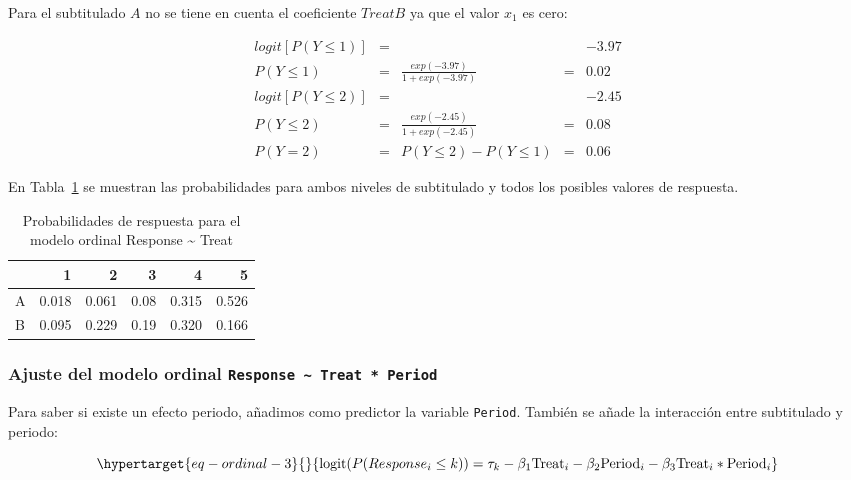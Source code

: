 \documentclass[
  12pt,
  a4paper,
  extrafontsizes,
  onecolumn,
  openright,
  table]{memoir}
\begin{document}
Para el subtitulado \(A\) no se tiene en cuenta el coeficiente
\(TreatB\) ya que el valor \(x_1\) es cero:

\[
\begin{aligned}
logit [P(Y \le 1)] & = & & & -3.97 \\
P(Y \le 1) & = & \frac{exp(-3.97)}{1 + exp(-3.97)} & = & 0.02 \\
logit [P(Y \le 2)] & = & & & -2.45 \\
P(Y \le 2) & = & \frac{exp(-2.45)}{1 + exp(-2.45)} & = & 0.08 \\
P(Y = 2) & = & P(Y \le 2) - P(Y \le 1) & = &  0.06 
\end{aligned}
\]

En Tabla~\ref{tbl-probs-clm-treat} se muestran las probabilidades para
ambos niveles de subtitulado y todos los posibles valores de respuesta.

\hypertarget{tbl-probs-clm-treat}{}
\begin{table}
\caption{\label{tbl-probs-clm-treat}Probabilidades de respuesta para el modelo ordinal Response
\textasciitilde{} Treat }\tabularnewline

\centering
\begin{tabular}{l|r|r|r|r|r}
\hline
  & 1 & 2 & 3 & 4 & 5\\
\hline
A & 0.018 & 0.061 & 0.08 & 0.315 & 0.526\\
\hline
B & 0.095 & 0.229 & 0.19 & 0.320 & 0.166\\
\hline
\end{tabular}
\end{table}

\hypertarget{sec-response-treat.period}{%
\subsubsection{\texorpdfstring{Ajuste del modelo ordinal
\texttt{Response\ \textasciitilde{}\ Treat\ *\ Period}}{Ajuste del modelo ordinal Response \textasciitilde{} Treat * Period}}\label{sec-response-treat.period}}

Para saber si existe un efecto periodo, añadimos como predictor la
variable \texttt{Period}. También se añade la interacción entre
subtitulado y periodo:

\small

\begin{equation}\protect\hypertarget{eq-ordinal-3}{}{
\text{logit}(P(Response_i \leq k)) = \tau_k - \beta_1 \text{Treat}_i - \beta_2 \text{Period}_i - \beta_3 \text{Treat}_i * \text{Period}_i
}\label{eq-ordinal-3}\end{equation}
\end{document}
